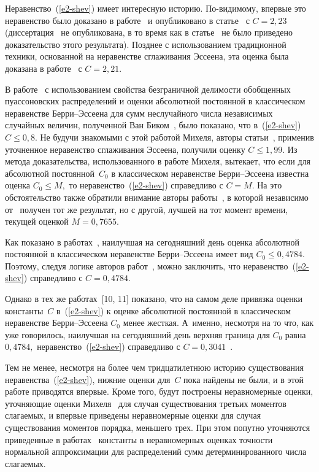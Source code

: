 \begin{multicols}{2}
  Неравенство~(\ref{e2-shev}) имеет интересную историю. По-видимому, впервые
это неравенство было доказано в работе~\cite{R1972} и опубликовано
в статье~\cite{R1976} с $C =2{{,}}23$ (диссертация~\cite{R1972} не
опубликована, в то время как в статье~\cite{R1976} не было
приведено доказательство этого результата). Позднее с
использованием традиционной техники, основанной на неравенстве
сглаживания Эссеена, эта оценка была доказана в работе~\cite{vonChossyRappl1983} с $C = 2{,}21.$

  В работе~\cite{Michel1993} с использованием свойства безграничной
делимости обобщенных пуассоновских распределений и оценки абсолютной
постоянной в классическом неравенстве Бер\-ри--Эс\-се\-ена для сумм
неслучайного числа независимых случайных величин, полученной Ван
Биком~\cite{vanBeek1972}, было показано, что в~(\ref{e2-shev}) $C\le 0{,}8.$
Не будучи знакомыми с этой работой Михеля, авторы статьи~\cite{BeningKorolevShorgin1997}, 
применив уточненное неравенство
сглаживания Эссеена, получили оценку $C\le 1{,}99$. Из метода
доказательства, использованного в работе Михеля, вытекает, что если
для абсолютной постоянной~$C_0$ в классическом неравенстве
Бер\-ри--Эс\-се\-ена известна оценка $C_0\le M,$ то неравенство~(\ref{e2-shev})
справедливо с $C=M$. На это обстоятельство также обратили внимание
авторы работы~\cite{KorolevShorgin1997}, в которой независимо от~\cite{Michel1993} 
получен тот же результат, но с другой, лучшей на
тот момент времени, текущей оценкой $M=0{,}7655.$

  Как показано в работах~\cite{KSOPPM2010, KSSAJ2010}, наилучшая на
сегодняшний день оценка абсолютной постоянной в классическом
неравенстве Бер\-ри--Эс\-се\-ена имеет вид $C_0\le 0{,}4784.$ Поэтому,
следуя логике авторов работ~\cite{Michel1993, KorolevShorgin1997}, 
можно заключить, что неравенство~(\ref{e2-shev}) справедливо с $C = 0{,}4784.$

  Однако в тех же работах~[10, 11] показано, что на самом деле привязка оценки
константы~$C$ в~(\ref{e2-shev}) к оценке абсолютной постоянной в
классическом неравенстве Бер\-ри--Эс\-се\-ена $C_0$ менее жесткая. 
А~именно, несмотря на то что, как уже говорилось, наилучшая на
сегодняшний день верхняя граница для $C_0$ равна $0{,}4784,$
неравенство~(\ref{e2-shev}) справедливо с $C=0{,}3041$~\cite{KSOPPM2010, KSSAJ2010}.

  Тем не менее, несмотря на более чем тридцатилетнюю историю
существования неравенства~(\ref{e2-shev}), нижние оценки для~$C$ пока
найдены не были, и в этой работе приводятся впервые.
  Кроме того, будут построены неравномерные оценки, уточ\-ня\-ющие оценки
Михеля~\cite{Michel1993} для случая существования третьих
моментов слагаемых, и впервые приведены неравномерные оценки для
случая существования моментов порядка, меньшего трех. При этом
попутно уточняются приведенные в работах~\cite{Michel1981, PaditzTysiak1990} константы в неравномерных оценках точности
нормальной аппроксимации для распределений сумм детерминированного
числа слагаемых.


\end{multicols}
